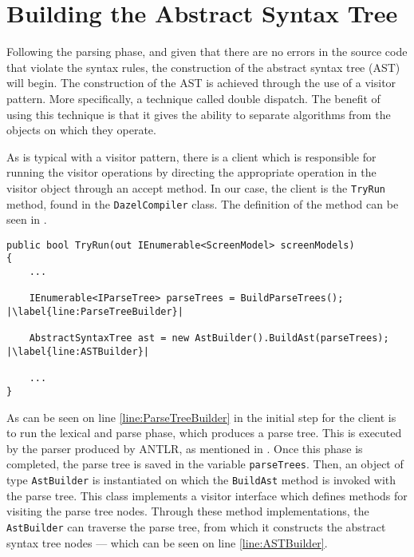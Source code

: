 \section{Building the Abstract Syntax Tree} \label{sec:buildASTSection}

Following the parsing phase, and given that there are no errors in the source code that violate the syntax rules, the construction of the abstract syntax tree (AST) will begin. The construction of the AST is achieved through the use of a visitor pattern. More specifically, a technique called double dispatch. The benefit of using this technique is that it gives the ability to separate algorithms from the objects on which they operate\cite{VisitorGuru}. 

As is typical with a visitor pattern, there is a client which is responsible for running the visitor operations by directing the appropriate operation in the visitor object through an accept method. In our case, the client is the \texttt{TryRun} method, found in the \texttt{DazelCompiler} class. The definition of the method can be seen in .

\begin{lstlisting}[language=CSharp, caption={The \texttt{TryRun} method that serves as a client inside the \texttt{DazelCompiler} class.}, label={lst:RunMethod},escapechar=|]
public bool TryRun(out IEnumerable<ScreenModel> screenModels)
{
    ...

    IEnumerable<IParseTree> parseTrees = BuildParseTrees(); |\label{line:ParseTreeBuilder}|

    AbstractSyntaxTree ast = new AstBuilder().BuildAst(parseTrees); |\label{line:ASTBuilder}|

    ...
}
\end{lstlisting}

As can be seen on line \ref{line:ParseTreeBuilder} in  the initial step for the client is to run the lexical and parse phase, which produces a parse tree. This is executed by the parser produced by ANTLR, as mentioned in . Once this phase is completed, the parse tree is saved in the variable \texttt{parseTrees}. Then, an object of type \texttt{AstBuilder} is instantiated on which the \texttt{BuildAst} method is invoked with the parse tree. This class implements a visitor interface which defines methods for visiting the parse tree nodes. Through these method implementations, the \texttt{AstBuilder} can traverse the parse tree, from which it constructs the abstract syntax tree nodes — which can be seen on line \ref{line:ASTBuilder}. 

